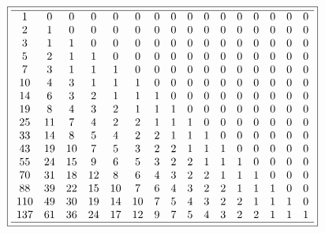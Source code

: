 \documentclass[10pt,reqno]{amsart}
\numberwithin{figure}{section}
\numberwithin{table}{section}
\theoremstyle{plain}
\numberwithin{theorem}{section}
\theoremstyle{remark}
\begin{document}
\begin{figure}[ht!]

\begin{minipage}{\linewidth} 
\begin{center} 
\tiny
\begin{equation*} 
\boxed{ 
\begin{array}{cccccccccccccccccc} \hline 
 1 & 0 & 0 & 0 & 0 & 0 & 0 & 0 & 0 & 0 & 0 & 0 & 0 & 0 & 0 & 0 \\
 2 & 1 & 0 & 0 & 0 & 0 & 0 & 0 & 0 & 0 & 0 & 0 & 0 & 0 & 0 & 0 \\
 3 & 1 & 1 & 0 & 0 & 0 & 0 & 0 & 0 & 0 & 0 & 0 & 0 & 0 & 0 & 0 \\
 5 & 2 & 1 & 1 & 0 & 0 & 0 & 0 & 0 & 0 & 0 & 0 & 0 & 0 & 0 & 0 \\
 7 & 3 & 1 & 1 & 1 & 0 & 0 & 0 & 0 & 0 & 0 & 0 & 0 & 0 & 0 & 0 \\
 10 & 4 & 3 & 1 & 1 & 1 & 0 & 0 & 0 & 0 & 0 & 0 & 0 & 0 & 0 & 0 \\
 14 & 6 & 3 & 2 & 1 & 1 & 1 & 0 & 0 & 0 & 0 & 0 & 0 & 0 & 0 & 0 \\
 19 & 8 & 4 & 3 & 2 & 1 & 1 & 1 & 0 & 0 & 0 & 0 & 0 & 0 & 0 & 0 \\
 25 & 11 & 7 & 4 & 2 & 2 & 1 & 1 & 1 & 0 & 0 & 0 & 0 & 0 & 0 & 0 \\
 33 & 14 & 8 & 5 & 4 & 2 & 2 & 1 & 1 & 1 & 0 & 0 & 0 & 0 & 0 & 0 \\
 43 & 19 & 10 & 7 & 5 & 3 & 2 & 2 & 1 & 1 & 1 & 0 & 0 & 0 & 0 & 0 \\
 55 & 24 & 15 & 9 & 6 & 5 & 3 & 2 & 2 & 1 & 1 & 1 & 0 & 0 & 0 & 0 \\
 70 & 31 & 18 & 12 & 8 & 6 & 4 & 3 & 2 & 2 & 1 & 1 & 1 & 0 & 0 & 0 \\
 88 & 39 & 22 & 15 & 10 & 7 & 6 & 4 & 3 & 2 & 2 & 1 & 1 & 1 & 0 & 0 \\
 110 & 49 & 30 & 19 & 14 & 10 & 7 & 5 & 4 & 3 & 2 & 2 & 1 & 1 & 1 & 0 \\
 137 & 61 & 36 & 24 & 17 & 12 & 9 & 7 & 5 & 4 & 3 & 2 & 2 & 1 & 1 & 1 \\
 \hline
\end{array}
}
\end{equation*}
\end{center} 
\end{minipage} 


\end{figure}
\end{document}
